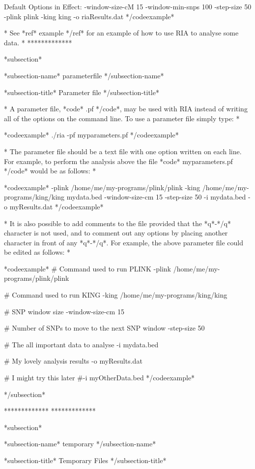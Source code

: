 Default Options in Effect:
  -window-size-cM 15
  -window-min-snps 100
  -step-size 50
  -plink plink
  -king king
  -o riaResults.dat
*/codeexample*

*
See *ref* example */ref* for an example of how to use RIA to analyse some data.
*
*************

*subsection*

*subsection-name* parameterfile */subsection-name*

*subsection-title* Parameter file */subsection-title*

* A parameter file, *code* .pf */code*, may be used with RIA instead of writing all of the options on the command line. To use a parameter file simply type: *

*codeexample*
./ria -pf myparameters.pf
*/codeexample*

* The parameter file should be a text file with one option written on each line. For example, to perform the analysis above the file *code* myparameters.pf */code* would be as follows: *

*codeexample*
-plink /home/me/my-programs/plink/plink
-king /home/me/my-programs/king/king mydata.bed
-window-size-cm 15
-step-size 50
-i mydata.bed
-o myResults.dat
*/codeexample*

* It is also possible to add comments to the file provided that the *q*-*/q* character is not used, and to comment out any options by placing another character in front of any *q*-*/q*. For example, the above parameter file could be edited as follows: *


*codeexample*
# Command used to run PLINK
-plink /home/me/my-programs/plink/plink

# Command used to run KING
-king /home/me/my-programs/king/king

# SNP window size
-window-size-cm 15

# Number of SNPs to move to the next SNP window
-step-size 50

# The all important data to analyse
-i mydata.bed

# My lovely analysis results
-o myResults.dat

# I might try this later
#-i myOtherData.bed
*/codeexample*

*/subsection*

*************
*************

*subsection*

*subsection-name* temporary */subsection-name*

*subsection-title* Temporary Files */subsection-title*


